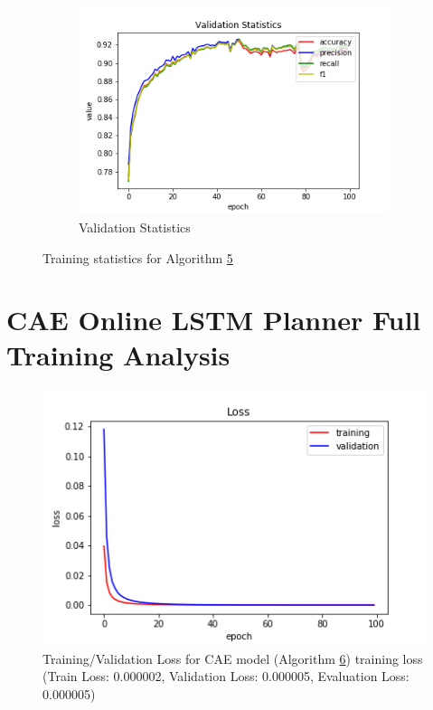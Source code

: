 \begin{figure}[h!]
\begin{subfigure}[b]{0.35\linewidth}
    \includegraphics[width=\linewidth]{images/trained_online_lstm/tile_by_tile_training_uniform_random_fill_10000_block_map_10000_house_10000_model_validation_stats.png}
     \caption{Validation Statistics}
  \end{subfigure}
  \caption{Training statistics for Algorithm \hyperref[tab: app_evalalgorithms]{5}}
  \label{fig: train_olnine_lstm_5}
\end{figure}

\clearpage

\section{CAE Online LSTM Planner Full Training Analysis}

\begin{figure}[h!]
    \centerfloat
    \includegraphics[scale=0.6]{images/cae_online_lstm/caelstm_section_cae_training_uniform_random_fill_10000_model_loss.png}
    \caption{Training/Validation Loss for CAE model (Algorithm \hyperref[tab: app_evalalgorithms]{6}) training loss (Train Loss: 0.000002, Validation Loss: 0.000005, Evaluation Loss: 0.000005)}
    \label{fig: cae_6_train}
\end{figure}

